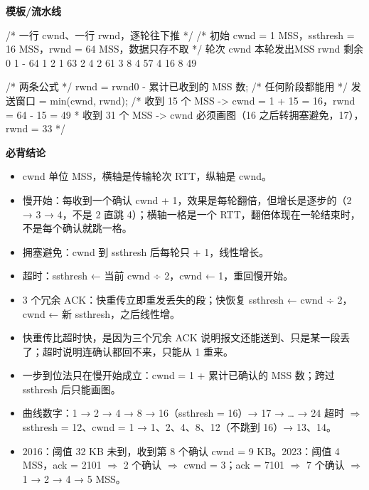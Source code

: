 \documentclass[10pt,a4paper]{ctexart}
\begin{document}
\textbf{模板/流水线}

\begin{codebox}
/* 一行 cwnd、一行 rwnd，逐轮往下推 */
/* 初始 cwnd = 1 MSS，ssthresh = 16 MSS，rwnd = 64 MSS，数据只存不取 */
轮次   cwnd     本轮发出MSS    rwnd 剩余
 0      1           -            64
 1      2           1            63
 2      4           2            61
 3      8           4            57
 4     16           8            49

/* 两条公式 */
rwnd = rwnd0 - 累计已收到的 MSS 数;      /* 任何阶段都能用 */
发送窗口 = min(cwnd, rwnd);
/* 收到 15 个 MSS -> cwnd = 1 + 15 = 16，rwnd = 64 - 15 = 49
 * 收到 31 个 MSS -> cwnd 必须画图（16 之后转拥塞避免，17），rwnd = 33
 */
\end{codebox}




\textbf{必背结论}

\begin{itemize}

\item cwnd 单位 MSS，横轴是传输轮次 RTT，纵轴是 cwnd。

\item 慢开始：每收到一个确认 cwnd + 1，效果是每轮翻倍，但增长是逐步的（2 → 3 → 4，不是 2 直跳 4）；横轴一格是一个 RTT，翻倍体现在一轮结束时，不是每个确认就跳一格。

\item 拥塞避免：cwnd 到 ssthresh 后每轮只 + 1，线性增长。

\item 超时：ssthresh ← 当前 cwnd ÷ 2，cwnd ← 1，重回慢开始。

\item 3 个冗余 ACK：快重传立即重发丢失的段；快恢复 ssthresh ← cwnd ÷ 2，cwnd ← 新 ssthresh，之后线性增。

\item 快重传比超时快，是因为三个冗余 ACK 说明报文还能送到、只是某一段丢了；超时说明连确认都回不来，只能从 1 重来。

\item 一步到位法只在慢开始成立：cwnd = 1 + 累计已确认的 MSS 数；跨过 ssthresh 后只能画图。

\item 曲线数字：1 → 2 → 4 → 8 → 16（ssthresh = 16）→ 17 → … → 24 超时 $\Rightarrow$ ssthresh = 12、cwnd = 1 → 1、2、4、8、12（不跳到 16）→ 13、14。

\item 2016：阈值 32 KB 未到，收到第 8 个确认 cwnd = 9 KB。2023：阈值 4 MSS，ack = 2101 $\Rightarrow$ 2 个确认 $\Rightarrow$ cwnd = 3；ack = 7101 $\Rightarrow$ 7 个确认 $\Rightarrow$ 1 → 2 → 4 → 5 MSS。

\end{itemize}
\end{document}
